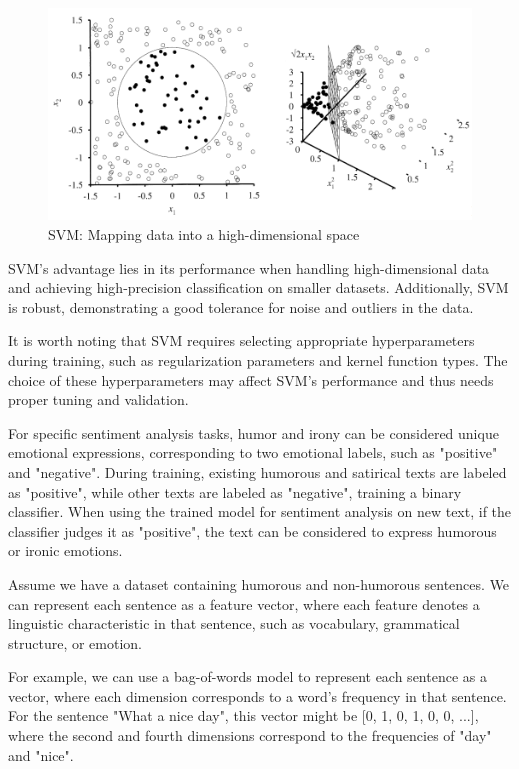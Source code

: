 \documentclass[a4paper]{article}
\begin{document}
\begin{figure}[H]
	\centering
	\includegraphics[width=1\textwidth]{./images/SVM_High-dimensional_Space.png}
	\caption{SVM: Mapping data into a high-dimensional space}
	\label{fig.SVM_High-dimensional_Space[SVMTutorial]}
\end{figure}

SVM's advantage lies in its performance when handling high-dimensional data and achieving high-precision classification on smaller datasets. Additionally, SVM is robust, demonstrating a good tolerance for noise and outliers in the data.

It is worth noting that SVM requires selecting appropriate hyperparameters during training, such as regularization parameters and kernel function types. The choice of these hyperparameters may affect SVM's performance and thus needs proper tuning and validation.

For specific sentiment analysis tasks, humor and irony can be considered unique emotional expressions, corresponding to two emotional labels, such as "positive" and "negative". During training, existing humorous and satirical texts are labeled as "positive", while other texts are labeled as "negative", training a binary classifier. When using the trained model for sentiment analysis on new text, if the classifier judges it as "positive", the text can be considered to express humorous or ironic emotions.

Assume we have a dataset containing humorous and non-humorous sentences. We can represent each sentence as a feature vector, where each feature denotes a linguistic characteristic in that sentence, such as vocabulary, grammatical structure, or emotion.

For example, we can use a bag-of-words model to represent each sentence as a vector, where each dimension corresponds to a word's frequency in that sentence. For the sentence "What a nice day", this vector might be [0, 1, 0, 1, 0, 0, ...], where the second and fourth dimensions correspond to the frequencies of "day" and "nice".
\end{document}
